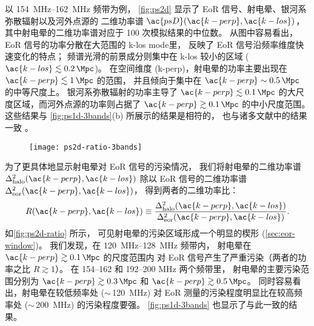 以 \SIrange{154}{162}{\MHz} 频带为例，
\autoref{fig:ps2d} 显示了 EoR 信号、射电晕、银河系弥散辐射以及河外点源的
二维功率谱 $\ac{psD}(\ac{k-perp}, \ac{k-los})$，
其中射电晕的二维功率谱对应于 100 次模拟结果的中位数。
从图中容易看出，EoR 信号的功率分散在大范围的 \ac{k-los} \ac{mode}里，
反映了 EoR 信号沿频率维度快速变化的特点；
频谱光滑的前景成分则集中在 \ac{k-los} 较小的区域
($\ac{k-los} \lesssim \SI{0.2}{\per\Mpc}$)。
在空间维度 (\ac{k-perp})，射电晕的功率主要出现在
$\ac{k-perp} \lesssim \SI{1}{\per\Mpc}$ 的范围，
并且倾向于集中在 $\ac{k-perp} \sim \SI{0.5}{\per\Mpc}$ 的中等尺度上。
银河系弥散辐射的功率主导了 $\ac{k-perp} \lesssim \SI{0.1}{\per\Mpc}$
的大尺度区域，而河外点源的功率则占据了 $\ac{k-perp} \gtrsim \SI{0.1}{\per\Mpc}$
的中小尺度范围。
这些结果与 \autoref{fig:ps1d-3bands}(b) 所展示的结果是相符的，
也与诸多文献中的结果一致 \cite{datta2010,trott2015,barry2016,chapman2016}。

\begin{figure}[htp]
  \centering
  \texttt{[image: ps2d-ratio-3bands]}
  \label{fig:ps2d-ratio}
\end{figure}

为了更具体地显示射电晕对 EoR 信号的污染情况，
我们将射电晕的二维功率谱 $\Delta^2_{\R{halo}}(\ac{k-perp}, \ac{k-los})$
除以 EoR 信号的二维功率谱 $\Delta^2_{\R{eor}}(\ac{k-perp}, \ac{k-los})$，
得到两者的二维功率比：
\begin{equation}
  R(\ac{k-perp}, \ac{k-los})
    \equiv \frac{\Delta^2_{\R{halo}}(\ac{k-perp}, \ac{k-los})}{
      \Delta^2_{\R{eor}}(\ac{k-perp}, \ac{k-los})} .
\end{equation}
如\autoref{fig:ps2d-ratio} 所示，
可见射电晕的污染区域形成一个明显的楔形 (\autoref{sec:eor-window})。
我们发现，在 \SIrange{120}{128}{\MHz} 频带内，
射电晕在 $\ac{k-perp} \gtrsim \SI{0.1}{\per\Mpc}$ 的尺度范围内
对 EoR 信号产生了严重污染（两者的功率之比 $R \gtrsim 1$）。
在 \numrange{154}{162} 和 \numrange{192}{200} \si{\MHz} 两个频带里，
射电晕的主要污染范围分别为 $\ac{k-perp} \gtrsim \SI{0.3}{\per\Mpc}$
和 $\ac{k-perp} \gtrsim \SI{0.5}{\per\Mpc}$。
同时容易看出，射电晕在较低频率处 ($\sim$\,\SI{120}{\MHz})
对 EoR 测量的污染程度明显比在较高频率处 ($\sim$\,\SI{200}{\MHz})
的污染程度要强。
\autoref{fig:ps1d-3bands} 也显示了与此一致的结果。

